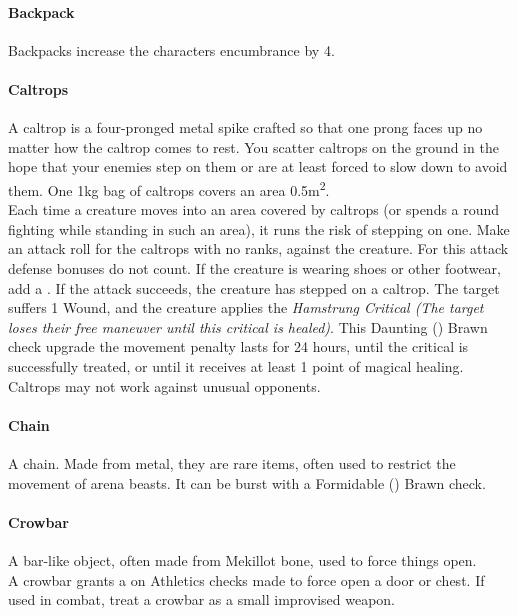\begin{multicols}{2}

\paragraph{Backpack} \label{advitm:backpack}
Backpacks increase the characters encumbrance by 4.

\paragraph{Caltrops} \label{advitm:caltrops}
A caltrop is a four-pronged metal spike crafted so that
one prong faces up no matter how the caltrop comes to
rest. You scatter caltrops on the ground in the hope that
your enemies step on them or are at least forced to slow
down to avoid them. One 1kg bag of caltrops
covers an area 0.5m\textsuperscript{2}.\\
Each time a creature moves into an area covered by
caltrops (or spends a round fighting while standing in
such an area), it runs the risk of stepping on one. Make
an attack roll for the caltrops with no ranks, against the
creature. For this attack defense bonuses do not count. If
the creature is wearing shoes or other footwear, add a
\setback. If the attack succeeds, the creature has stepped on a
caltrop. The target suffers 1 Wound, and the creature
applies the \textit{Hamstrung Critical (The target loses their
free maneuver until this critical is healed)}. This
Daunting (\difficulty\difficulty\difficulty\difficulty)
Brawn check upgrade the
movement penalty lasts for 24 hours, until the critical is
successfully treated, or until it receives at least 1 point
of magical healing.\\
Caltrops may not work against unusual opponents.

\paragraph{Chain} \label{advitm:chain}
A chain. Made from metal, they are rare items, often used to
restrict the movement of arena beasts.
It can be burst with a Formidable
(\difficulty\difficulty\difficulty\difficulty\difficulty)
Brawn check.

\paragraph{Crowbar} \label{advitm:crowbar}
A bar-like object, often made from Mekillot bone, used to
force things open.\\
A crowbar grants a \boost on Athletics checks made to force
open a door or chest. If used in combat, treat a crowbar
as a small improvised weapon.


\end{multicols}

